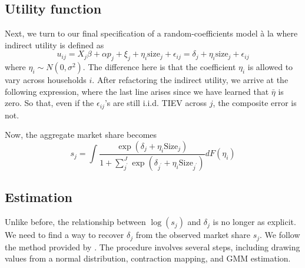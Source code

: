 \documentclass[12pt]{article}[margin=1in]
\begin{document}
\subsection{Utility function}
Next, we turn to our final specification of a random-coefficients model \`a la
\citet{berrylevinsohnpakes1995} where indirect utility is defined as
\begin{equation}
    u_{ij}=X_{j}\beta + \alpha p_{j} + \xi_{j} + \eta_i\text{size}_j + \epsilon_{ij} = \delta_j + \eta_i\text{size}_j + \epsilon_{ij}
\end{equation}
where $\eta_i \sim N(0,\sigma^2)$.
The difference here is that the coefficient $\eta_i$ is allowed to vary across
households $i$. After refactoring the indirect utility, we arrive at the
following expression, where the last line arises since we have learned that
$\bar{\eta}$ is zero. So that, even if the $\epsilon_{ij}$'s are still i.i.d.
TIEV across $j$, the composite error is not.

Now, the aggregate market share becomes
\[
    s_j = \int \frac{\exp{(\delta_j + \eta_i \text{Size}_j)}}{1 + \sum_{j^{\prime}}^{J} \exp{(\delta_{j^{\prime}} + \eta_i \text{Size}_{j^{\prime}})}} dF(\eta_i)
\]

\subsection{Estimation}
Unlike before, the relationship between $\log(s_j)$ and $\delta_j$ is no longer
as explicit. We need to find a way to recover $\delta_j$ from the observed
market share $s_j$. We follow the method provided by
\citet{berrylevinsohnpakes1995}. The procedure involves several steps,
including drawing values from a normal distribution, contraction mapping, and
GMM estimation.
\end{document}
